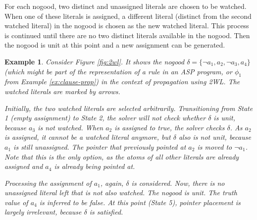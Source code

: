 \documentclass{vutinfth} %
\newtheorem{example}{Example}[chapter]
\begin{document}
For each nogood, two distinct and unassigned literals are chosen to be watched. When one of these literals is assigned, a different literal (distinct from the second watched literal) in the nogood is chosen as the new watched literal. This process is continued until there are no two distinct literals available in the nogood. Then the nogood is unit at this point and a new assignment can be generated.

\begin{example}
Consider Figure \ref{fig:2wl}. It shows the nogood $\delta = \{\neg a_1, a_2, \neg a_3, a_4 \}$ (which might be part of the representation of a rule in an ASP program, or $\phi_1$ from Example \ref{ex:clause-prop}) in the context of propagation using 2WL. The watched literals are marked by arrows.

Initially, the two watched literals are selected arbitrarily. Transitioning from State 1 (empty assignment) to State 2, the solver will not check whether $\delta$ is unit, because $a_3$ is not watched. When $a_2$ is assigned to \emph{true}, the solver checks $\delta$. As $a_2$ is assigned, it cannot be a watched literal anymore, but $\delta$ also is not unit, because $a_1$ is still unassigned. The pointer that previously pointed at $a_2$ is moved to $\neg a_1$. Note that this is the only option, as the atoms of all other literals are already assigned and $a_4$ is already being pointed at.

Processing the assignment of $a_1$, again, $\delta$ is considered. Now, there is no unassigned literal left that is not also watched. The nogood is unit. The truth value of $a_4$ is inferred to be \emph{false}. At this point (State 5), pointer placement is largely irrelevant, because $\delta$ is satisfied.
\end{example}
\end{document}

